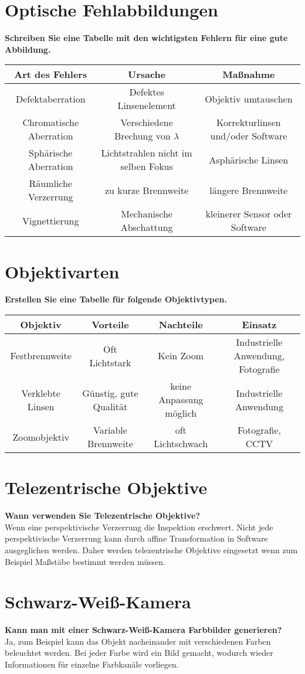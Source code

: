 \documentclass[a4paper]{article}
\begin{document}
	\section{Optische Fehlabbildungen}
	\textbf{Schreiben Sie eine Tabelle mit den wichtigsten Fehlern für eine gute Abbildung.}\\
		\begin{tabular}{ c|c|c }
			Art des Fehlers & Ursache & Maßnahme \\ 
			\hline
			Defektaberration & Defektes Linsenelement & Objektiv umtauschen \\
			Chromatische Aberration & Verschiedene Brechung von $\lambda$ & Korrekturlinsen und/oder Software\\
			Sphärische Aberration & Lichtstrahlen nicht im selben Fokus & Asphärische Linsen\\
			Räumliche Verzerrung & zu kurze Brennweite & längere Brennweite\\
			Vignettierung & Mechanische Abschattung & kleinerer Sensor oder Software
		\end{tabular}

	
	\section{Objektivarten}
	\textbf{Erstellen Sie eine Tabelle für folgende Objektivtypen.}\\
		\begin{tabular}{ c|c|c|c }
			Objektiv & Vorteile & Nachteile & Einsatz \\ 
			\hline
			Festbrennweite & Oft Lichtstark & Kein Zoom & Industrielle Anwendung, Fotografie\\
			Verklebte Linsen & Günstig, gute Qualität & keine Anpassung möglich & Industrielle Anwendung\\
			Zoomobjektiv & Variable Brennweite & oft Lichtschwach & Fotografie, CCTV
		\end{tabular}
	
	\section{Telezentrische Objektive}
	\textbf{Wann verwenden Sie Telezentrische Objektive?}\\
	Wenn eine perspektivische Verzerrung die Inspektion erschwert. Nicht jede perspektivische Verzerrung kann durch affine Transformation in Software ausgeglichen werden. Daher werden telezentrische Objektive eingesetzt wenn zum Beispiel Maßstäbe bestimmt werden müssen.\\
	
	\section{Schwarz-Weiß-Kamera}
	\textbf{Kann man mit einer Schwarz-Weiß-Kamera Farbbilder generieren?}\\
	Ja, zum Beispiel kann das Objekt nacheinander mit verschiedenen Farben beleuchtet werden. Bei jeder Farbe wird ein Bild gemacht, wodurch wieder Informationen für einzelne Farbkanäle vorliegen.

	
	
\end{document}
